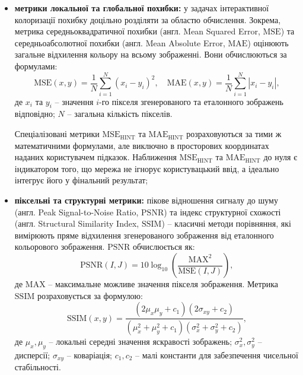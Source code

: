         \begin{itemize}[label=$\bullet$]
            \item \textbf{метрики локальної та глобальної похибки:}
                у задачах інтерактивної колоризації похибку доцільно розділяти за областю обчислення.
                Зокрема, метрика середньоквадратичної похибки (англ. Mean Squared Error, $\mathrm{MSE}$) 
                та середньоабсолютної похибки (англ. Mean Absolute Error, $\mathrm{MAE}$)
                оцінюють загальне відхилення кольору на всьому зображенні.
                Вони обчислюються за формулами:
                \begin{equation*}
                    \mathrm{MSE}(x, y) = \frac{1}{N} \sum_{i=1}^N (x_i - y_i)^2, \quad \mathrm{MAE}(x, y) = \frac{1}{N} \sum_{i=1}^N |x_i - y_i|,
                \end{equation*}
                де $x_i$ та $y_i$ -- значення $i$-го пікселя згенерованого та еталонного зображень відповідно; $N$ -- загальна кількість пікселів.
                
                Спеціалізовані метрики $\mathrm{MSE}_{\mathrm{HINT}}$ та $\mathrm{MAE}_{\mathrm{HINT}}$ розраховуються за тими ж математичними формулами, але виключно в просторових координатах наданих користувачем підказок.
                Наближення $\mathrm{MSE}_{\mathrm{HINT}}$ та $\mathrm{MAE}_{\mathrm{HINT}}$ до нуля є індикатором того,
                що мережа не ігнорує користувацький ввід, а ідеально інтегрує його у фінальний результат;

            \item \textbf{піксельні та структурні метрики:}
                пікове відношення сигналу до шуму (англ. Peak Signal-to-Noise Ratio, $\mathrm{PSNR}$) \cite{2010-hore-psnr-vs-ssim} та індекс структурної схожості (англ. Structural Similarity Index, $\mathrm{SSIM}$) \cite{2004-wang-image-quality} -- класичні методи порівняння,
                які вимірюють пряме відхилення згенерованого зображення від еталонного кольорового зображення.
                $\mathrm{PSNR}$ обчислюється як:
                \begin{equation*}
                    \mathrm{PSNR}(I, J) = 10 \log_{10} \left( \frac{\mathrm{MAX}^2}{\mathrm{MSE}(I, J)} \right),
                \end{equation*}
                де $\mathrm{MAX}$ -- максимальне можливе значення пікселя зображення.
                Метрика $\mathrm{SSIM}$ розраховується за формулою:
                \begin{equation*}
                    \mathrm{SSIM}(x, y) = \frac{(2\mu_x\mu_y + c_1)(2\sigma_{xy} + c_2)}{(\mu_x^2 + \mu_y^2 + c_1)(\sigma_x^2 + \sigma_y^2 + c_2)},
                \end{equation*}
                де $\mu_x, \mu_y$ -- локальні середні значення яскравості зображень; $\sigma_x^2, \sigma_y^2$ -- дисперсії; $\sigma_{xy}$ -- коваріація; $c_1, c_2$ -- малі константи для забезпечення чисельної стабільності.
                

\end{itemize}
